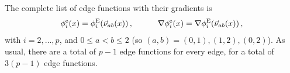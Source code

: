 The complete list of edge functions with their gradients is
\begin{equation}
	\phi_i^\mathrm{e}(x)=\phi_i^{\mathrm{E}}(\vec{\nu}_{ab}(x))\,,\qquad\quad\nabla\phi_i^\mathrm{e}(x)=\nabla\phi_i^{\mathrm{E}}(\vec{\nu}_{ab}(x))\,,
	\label{eq:Triphigeneral}
\end{equation}
with $i=2,\ldots,p$, and $0\leq a<b\leq2$ (so $(a,b)=(0,1),(1,2),(0,2)$). As usual, there are a total of $p-1$ edge functions for every edge, for a total of $3(p-1)$ edge functions.
%
%

